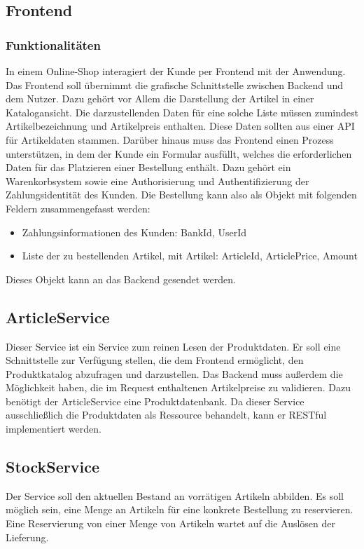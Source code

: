 \subsection{Frontend}
\subsubsection{Funktionalitäten}
In einem Online-Shop interagiert der Kunde per Frontend mit der Anwendung. Das Frontend soll übernimmt die grafische Schnittstelle zwischen Backend und dem Nutzer. Dazu gehört vor Allem die Darstellung der Artikel in einer Katalogansicht. Die darzustellenden Daten für eine solche Liste müssen zumindest Artikelbezeichnung und Artikelpreis enthalten. Diese Daten sollten aus einer API für Artikeldaten stammen. Darüber hinaus muss das Frontend einen Prozess unterstützen, in dem der Kunde ein Formular ausfüllt, welches die erforderlichen Daten für das Platzieren einer Bestellung enthält. Dazu gehört ein Warenkorbsystem sowie eine Authorisierung und Authentifizierung der Zahlungsidentität des Kunden. Die Bestellung kann also als Objekt mit folgenden Feldern zusammengefasst werden:
\begin{itemize}
	\item Zahlungsinformationen des Kunden: BankId, UserId
	\item Liste der zu bestellenden Artikel, mit Artikel: ArticleId, ArticlePrice, Amount
\end{itemize}

Dieses Objekt kann an das Backend gesendet werden. 

\subsection{ArticleService}
Dieser Service ist ein Service zum reinen Lesen der Produktdaten. Er soll eine Schnittstelle zur Verfügung stellen, die dem Frontend ermöglicht, den Produktkatalog abzufragen und darzustellen. Das Backend muss außerdem die Möglichkeit haben, die im Request enthaltenen Artikelpreise zu validieren. Dazu benötigt der ArticleService eine Produktdatenbank. Da dieser Service ausschließlich die Produktdaten als Ressource behandelt, kann er RESTful implementiert werden.

\subsection{StockService}
Der Service soll den aktuellen Bestand an vorrätigen Artikeln abbilden. Es soll möglich sein, eine Menge an Artikeln für eine konkrete Bestellung zu reservieren. Eine Reservierung von einer Menge von Artikeln wartet auf die Auslösen der Lieferung.

